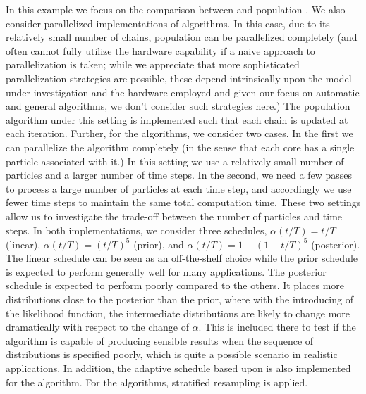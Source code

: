 In this example we focus on the comparison between \smc[2] and population
\mcmc. We also consider parallelized implementations of algorithms. In this
case, due to its relatively small number of chains, population \mcmc can be
parallelized completely (and often cannot fully utilize the hardware
capability if a na\"\i ve approach to parallelization is taken; while we
appreciate that more sophisticated parallelization strategies are possible,
these depend intrinsically upon the model under investigation and the hardware
employed and given our focus on automatic and general algorithms, we don't
consider such strategies here.) The population \mcmc algorithm under this
setting is implemented such that each chain is updated at each iteration.
Further, for the \smc algorithms, we consider two cases. In the first we can
parallelize the algorithm completely (in the sense that each core has a single
particle associated with it.) In this setting we use a relatively small number
of particles and a larger number of time steps. In the second, we need a few
passes to process a large number of particles at each time step, and
accordingly we use fewer time steps to maintain the same total computation
time. These two settings allow us to investigate the trade-off between the
number of particles and time steps. In both implementations, we consider three
schedules, $\alpha(t/T) = t/T$ (linear), $\alpha(t/T) = (t/T)^5$ (prior), and
$\alpha(t/T) = 1 - (1 - t/T)^5$ (posterior). The linear schedule can be seen
as an off-the-shelf choice while the prior schedule is expected to perform
generally well for many applications. The posterior schedule is expected to
perform poorly compared to the others. It places more distributions close to
the posterior than the prior, where with the introducing of the likelihood
function, the intermediate distributions are likely to change more
dramatically with respect to the change of $\alpha$. This is included there to
test if the algorithm is capable of producing sensible results when the
sequence of distributions is specified poorly, which is quite a possible
scenario in realistic applications. In addition, the adaptive schedule based
upon \cess is also implemented for the \smc[2] algorithm. For the \smc
algorithms, stratified resampling is applied.


